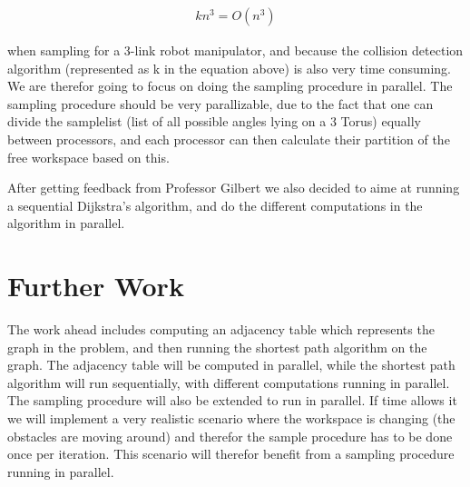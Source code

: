 \begin{align}
\label{eq:}
kn^3=O(n^3) 
 \end{align}

when sampling for a 3-link robot manipulator, and because the collision detection algorithm (represented as k in the equation above) is also very time consuming. We are therefor going to focus on doing the sampling procedure in parallel. The sampling procedure should be very parallizable, due to the fact that one can divide the samplelist (list of all possible angles lying on a 3 Torus) equally between processors, and each processor can then calculate their partition of the free workspace based on this. 

After getting feedback from Professor Gilbert we also decided to  aime at running a sequential Dijkstra's algorithm, and do the different computations in the algorithm in parallel. 

\section*{Further Work}

The work ahead includes computing an adjacency table which represents the graph in the problem, and then running the shortest path algorithm on the graph. The adjacency table will be computed in parallel, while the shortest path algorithm will run sequentially, with different computations running in parallel. The sampling procedure will also be extended to run in parallel. If time allows it we will implement a very realistic scenario where the workspace is changing (the obstacles are moving around) and therefor the sample procedure has to be done once per iteration. This scenario will therefor benefit from a sampling procedure running in parallel.








